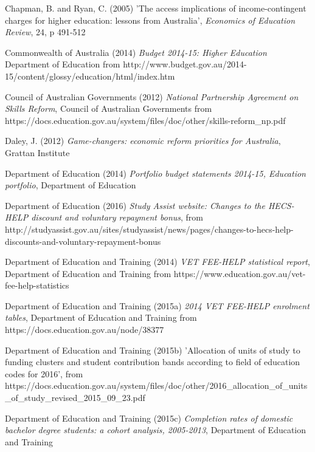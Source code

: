\documentclass[]{book}
\begin{document}
\protect\hypertarget{_ENREF_17}{}{}Chapman, B. and Ryan, C. (2005) 'The access implications of income-contingent charges for higher education: lessons from Australia', \emph{Economics of Education Review}, 24, p 491-512

\protect\hypertarget{_ENREF_18}{}{}Commonwealth of Australia (2014) \emph{Budget 2014-15: Higher Education} Department of Education from http://www.budget.gov.au/2014-15/content/glossy/education/html/index.htm

\protect\hypertarget{_ENREF_19}{}{}Council of Australian Governments (2012) \emph{National Partnership Agreement on Skills Reform}, Council of Australian Governments from https://docs.education.gov.au/system/files/doc/other/skills-reform\_np.pdf

\protect\hypertarget{_ENREF_20}{}{}Daley, J. (2012) \emph{Game-changers: economic reform priorities for Australia}, Grattan Institute

\protect\hypertarget{_ENREF_21}{}{}Department of Education (2014) \emph{Portfolio budget statements 2014-15, Education portfolio}, Department of Education

\protect\hypertarget{_ENREF_22}{}{}Department of Education (2016) \emph{Study Assist website: Changes to the HECS-HELP discount and voluntary repayment bonus}, from http://studyassist.gov.au/sites/studyassist/news/pages/changes-to-hecs-help-discounts-and-voluntary-repayment-bonus

\protect\hypertarget{_ENREF_23}{}{}Department of Education and Training (2014) \emph{VET FEE-HELP statistical report}, Department of Education and Training from https://www.education.gov.au/vet-fee-help-statistics

\protect\hypertarget{_ENREF_24}{}{}Department of Education and Training (2015a) \emph{2014 VET FEE-HELP enrolment tables}, Department of Education and Training from https://docs.education.gov.au/node/38377

\protect\hypertarget{_ENREF_25}{}{}Department of Education and Training (2015b) 'Allocation of units of study to funding clusters and student contribution bands according to field of education codes for 2016', from https://docs.education.gov.au/system/files/doc/other/2016\_allocation\_of\_units\_of\_study\_revised\_2015\_09\_23.pdf

\protect\hypertarget{_ENREF_26}{}{}Department of Education and Training (2015c) \emph{Completion rates of domestic bachelor degree students: a cohort analysis, 2005-2013}, Department of Education and Training
\end{document}
